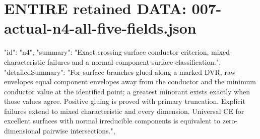 \documentclass[11pt]{article}
\begin{document}
\section{ENTIRE retained DATA: 007-actual-n4-all-five-fields.json}
\begin{Full422Data}
{
  "id": "n4",
  "summary": "Exact crossing-surface conductor criterion, mixed-characteristic failures and a normal-component surface classification.",
  "detailedSummary": "For surface branches glued along a marked DVR, raw envelopes equal component envelopes away from the conductor and the minimum conductor value at the identified point; a greatest minorant exists exactly when those values agree. Positive gluing is proved with primary truncation. Explicit failures extend to mixed characteristic and every dimension. Universal CE for excellent surfaces with normal irreducible components is equivalent to zero-dimensional pairwise intersections.",
}
\end{Full422Data}
\end{document}
